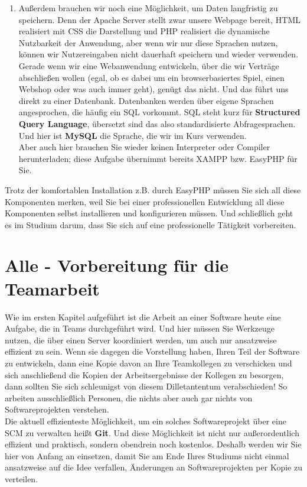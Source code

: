 \begin{enumerate}
	\item Außerdem brauchen wir noch eine Möglichkeit, um Daten langfristig zu speichern. Denn der Apache Server stellt zwar unsere Webpage bereit, HTML realisiert mit CSS die Darstellung und PHP realisiert die dynamische Nutzbarkeit der Anwendung, aber wenn wir nur diese Sprachen nutzen, können wir Nutzereingaben nicht dauerhaft speichern und wieder verwenden.\\
	Gerade wenn wir eine Webanwendung entwickeln, über die wir Verträge abschließen wollen (egal, ob es dabei um ein browserbasiertes Spiel, einen Webshop oder was auch immer geht), genügt das nicht. Und das führt uns direkt zu einer Datenbank. Datenbanken werden über eigene Sprachen angesprochen, die häufig ein SQL vorkommt. SQL steht kurz für \textbf{Structured Query Language}, übersetzt sind das also standardisierte Abfragesprachen. Und hier ist \textbf{MySQL} die Sprache, die wir im Kurs verwenden.\\
	Aber auch hier brauchen Sie wieder keinen Interpreter oder Compiler herunterladen; diese Aufgabe übernimmt bereits XAMPP bzw. EasyPHP für Sie.
\end{enumerate}

Trotz der komfortablen Installation z.B. durch EasyPHP müssen Sie sich all diese Komponenten merken, weil Sie bei einer professionellen Entwicklung all diese Komponenten selbst installieren und konfigurieren müssen. Und schließlich geht es im Studium darum, dass Sie sich auf eine professionelle Tätigkeit vorbereiten.

\section{Alle - Vorbereitung für die Teamarbeit}

Wie im ersten Kapitel aufgeführt ist die Arbeit an einer Software heute eine Aufgabe, die in Teams durchgeführt wird. Und hier müssen Sie Werkzeuge nutzen, die über einen Server koordiniert werden, um auch nur ansatzweise effizient zu sein. Wenn sie dagegen die Vorstellung haben, Ihren Teil der Software zu entwickeln, dann eine Kopie davon an Ihre Teamkollegen zu verschicken und sich anschließend die Kopien der Arbeitsergebnisse der Kollegen zu besorgen, dann sollten Sie sich schleunigst von diesem Dilletantentum verabschieden! So arbeiten ausschließlich Personen, die nichts aber auch gar nichts von Softwareprojekten verstehen.\\

Die aktuell effizienteste Möglichkeit, um ein solches Softwareprojekt über eine SCM zu verwalten heißt \textbf{Git}. Und diese Möglichkeit ist nicht nur außerordentlich effizient und praktisch, sondern obendrein noch kostenlos. Deshalb werden wir Sie hier von Anfang an einsetzen, damit Sie am Ende Ihres Studiums nicht einmal ansatzweise auf die Idee verfallen, Änderungen an Softwareprojekten per Kopie zu verteilen.\\

